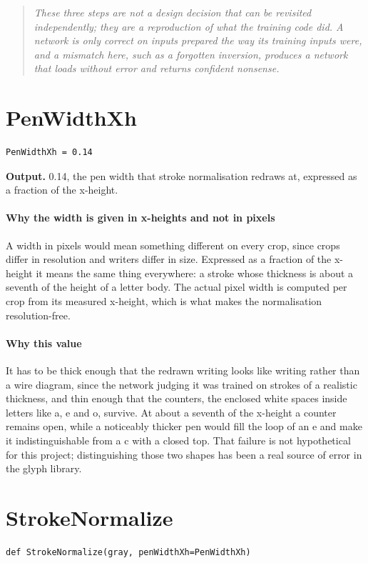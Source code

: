 \begin{quote}\small\itshape These three steps are not a design decision that can be revisited independently; they are a reproduction of what the training code did. A network is only correct on inputs prepared the way its training inputs were, and a mismatch here, such as a forgotten inversion, produces a network that loads without error and returns confident nonsense.\end{quote}

\section{PenWidthXh}
\begin{lstlisting}[style=sig]
PenWidthXh = 0.14
\end{lstlisting}

\noindent\textbf{Output.} 0.14, the pen width that stroke normalisation redraws at, expressed as a fraction of the x-height.


\paragraph{Why the width is given in x-heights and not in pixels}
A width in pixels would mean something different on every crop, since crops differ in resolution and writers differ in size. Expressed as a fraction of the x-height it means the same thing everywhere: a stroke whose thickness is about a seventh of the height of a letter body. The actual pixel width is computed per crop from its measured x-height, which is what makes the normalisation resolution-free.


\paragraph{Why this value}
It has to be thick enough that the redrawn writing looks like writing rather than a wire diagram, since the network judging it was trained on strokes of a realistic thickness, and thin enough that the counters, the enclosed white spaces inside letters like a, e and o, survive. At about a seventh of the x-height a counter remains open, while a noticeably thicker pen would fill the loop of an e and make it indistinguishable from a c with a closed top. That failure is not hypothetical for this project; distinguishing those two shapes has been a real source of error in the glyph library.


\section{StrokeNormalize}
\begin{lstlisting}[style=sig]
def StrokeNormalize(gray, penWidthXh=PenWidthXh)
\end{lstlisting}

